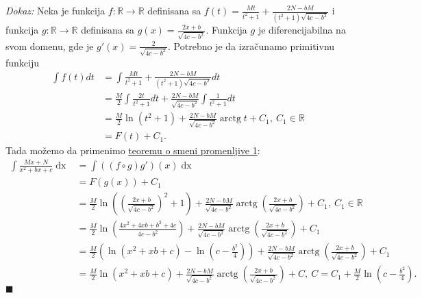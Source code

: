 \documentclass{article}
\DeclareMathOperator{\arctg}{arctg}
\DeclareMathOperator{\dx}{dx}
\begin{document}
\textit{Dokaz:} Neka je funkcija $ f:\mathbb{R}\longrightarrow\mathbb{R}$ definisana sa
$\displaystyle f\left(t\right)=\frac{Mt}{t^2+1}+\frac{2N-bM}{\left(t^2+1\right)\sqrt{4c-b^2}}$ i funkcija $g:\mathbb{R}\longrightarrow\mathbb{R}$
definisana sa $\displaystyle g\left(x\right)=\frac{2x+b}{\sqrt{4c-b^2}}$. Funkcija $g$ je diferencijabilna na svom domenu, gde je $\displaystyle g'\left(x\right)=\frac{2}{\sqrt{4c-b^2}}$.
Potrebno je da izračunamo primitivnu funkciju
\begin{align*}
    \int f\left(t\right)dt & =\int \frac{Mt}{t^2+1}+\frac{2N-bM}{\left(t^2+1\right)\sqrt{4c-b^2}}dt                        \\
                           & =\frac{M}{2}\int \frac{2t}{t^2+1}dt+\frac{2N-bM}{\sqrt{4c-b^2}}\int\frac{1}{t^2+1}dt          \\
                           & =\frac{M}{2}\ln\left(t^2+1\right)+\frac{2N-bM}{\sqrt{4c-b^2}}\arctg{t}+C_1,\ C_1\in\mathbb{R} \\
                           & =F\left(t\right)+C_1.
\end{align*}
Tada možemo da primenimo \hyperref[teorema_1.2]{teoremu o smeni promenljive 1}:
\begin{align*}
    \int \frac{Mx+N}{x^2+bx+c}\dx & = \int \left(\left(f\circ g\right) g'\right)\left(x\right)\dx                                                                                                               \\
                                  & = F\left(g\left(x\right)\right) + C_1                                                                                                                                       \\
                                  & = \frac{M}{2}\ln\left(\left(\frac{2x+b}{\sqrt{4c-b^2}}\right)^2+1\right)+\frac{2N-bM}{\sqrt{4c-b^2}}\arctg\left({\frac{2x+b}{\sqrt{4c-b^2}}}\right)+ C_1,\ C_1\in\mathbb{R} \\
                                  & = \frac{M}{2}\ln\left(\frac{4x^2+4xb+b^2+4c}{4c-b^2}\right)+\frac{2N-bM}{\sqrt{4c-b^2}}\arctg\left({\frac{2x+b}{\sqrt{4c-b^2}}}\right)+ C_1                                 \\
                                  & = \frac{M}{2}\left(\ln\left(x^2+xb+c\right)-\ln\left(c-\frac{b^2}{4}\right)\right)+\frac{2N-bM}{\sqrt{4c-b^2}}\arctg\left({\frac{2x+b}{\sqrt{4c-b^2}}}\right)+ C_1          \\
                                  & = \frac{M}{2}\ln\left(x^2+xb+c\right)+\frac{2N-bM}{\sqrt{4c-b^2}}\arctg\left({\frac{2x+b}{\sqrt{4c-b^2}}}\right)+ C,\ C=C_1+ \frac{M}{2}\ln\left(c-\frac{b^2}{4}\right).
\end{align*}
\null\hfill $\blacksquare$\par
\end{document}
